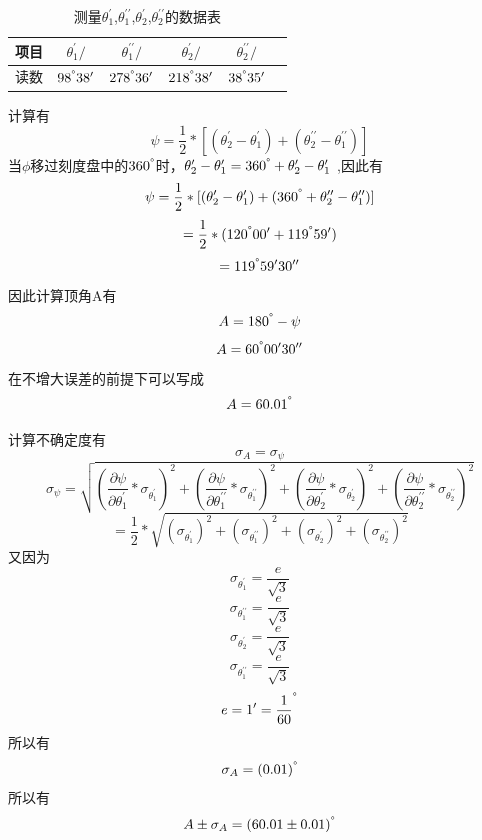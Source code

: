 \documentclass[a4paper,11pt]{article}
\begin{document}
	\begin{table}[H]
		\centering\caption{测量$\theta_{1}^{\prime }$,$\theta_{1}^{\prime \prime}$,$\theta_{2}^{\prime } $,$\theta_{2}^{\prime \prime } $的数据表}
		\small
		\begin{tabularx}{.85\linewidth}{C{1} *5{C{.8}}}
			\toprule
			\textbf{项目} &
			$\theta_{1}^{\prime } / \si{}$ &
			$\theta_{1}^{\prime \prime}/ \si{}$ &
			$\theta_{2}^{\prime }/ \si{}$ &
			$\theta_{2}^{\prime \prime} / \si{}$ & \\
			\midrule
			读数     & $ 98^{\degree}38^{\prime} $  & $ 278^{\degree}36^{\prime} $ & $ 218^{\degree}38^{\prime} $ &  $ 38^{\degree}35^{\prime} $    \\
			\bottomrule
		\end{tabularx}
		\vspace{3ex}
	\end{table}\noindent%
    计算有
    $$ \psi = \frac{1}{2} * [(\theta_{2}^{\prime } - \theta_{1}^{\prime }) + ( \theta_{2}^{\prime \prime } -\theta_{1}^{\prime \prime } )] $$
    当$\phi $移过刻度盘中的$360^{\degree} $时，$\theta_{2}^{\prime } - \theta_{1}^{\prime } = 360^{\degree} + \theta_{2}^{\prime } - \theta_{1}^{\prime }$ ,因此有\\
    $$ \psi = \frac{1}{2} * [(\theta_{2}^{\prime } - \theta_{1}^{\prime }) + ( 360^{\degree} +\theta_{2}^{\prime \prime } -\theta_{1}^{\prime \prime } )] $$
    $$ = \frac{1}{2} * (120^{\degree}00^{\prime} + 119^{\degree}59^{\prime}) $$
    $$ = 119^{\degree}59^{\prime}30^{\prime \prime}$$
    因此计算顶角A有
    $$  A = 180^{\degree} - \psi $$
    $$  A = 60^{\degree}00^{\prime}30^{\prime \prime} $$
    在不增大误差的前提下可以写成
    $$  A = 60.01^{\degree} $$
    
    计算不确定度有
    $$ \sigma_{A} = \sigma_{\psi} $$
    $$ \sigma_{\psi} = \sqrt{(\dfrac{\partial \psi}{\partial \theta_{1}^{\prime }} * \sigma_{\theta_{1}^{\prime }})^{2} + (\dfrac{\partial \psi}{\partial \theta_{1}^{\prime \prime}} * \sigma_{\theta_{1}^{\prime \prime}})^{2} + (\dfrac{\partial \psi}{\partial \theta_{2}^{\prime }} * \sigma_{\theta_{2}^{\prime }})^{2} + (\dfrac{\partial \psi}{\partial \theta_{2}^{\prime \prime}} * \sigma_{\theta_{2}^{\prime \prime}})^{2} }$$
    $$ = \frac{1}{2} * \sqrt{(  \sigma_{\theta_{1}^{\prime }})^{2} + (\sigma_{\theta_{1}^{\prime \prime}})^{2} + ( \sigma_{\theta_{2}^{\prime }})^{2} + (\sigma_{\theta_{2}^{\prime \prime}})^{2}} $$
    又因为
    $$ \sigma_{\theta_{1}^{\prime }} = \frac{e}{\sqrt{3}} $$
    $$ \sigma_{\theta_{1}^{\prime \prime}} = \frac{e}{\sqrt{3}} $$
    $$ \sigma_{\theta_{2}^{\prime }} = \frac{e}{\sqrt{3}} $$
    $$ \sigma_{\theta_{1}^{\prime \prime }} = \frac{e}{\sqrt{3}} $$
    $$ e = 1^{\prime} = \frac{1}{60}^{\degree} $$
    所以有
    $$ \sigma_{A} = (0.01)^{\degree} $$
    所以有
    $$ A \pm \sigma_{A} = (60.01 \pm 0.01 )^{\degree} $$
    
\end{document}
